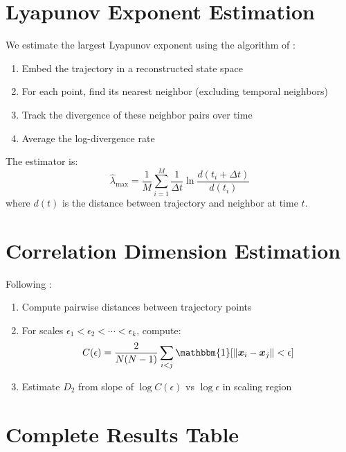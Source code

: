 \documentclass[10pt]{article} %
\theoremstyle{plain}
\theoremstyle{definition}
\theoremstyle{remark}
\newcommand{\norm}[1]{\left\lVert#1\right\rVert}
\newcommand{\vect}[1]{\bm{#1}}
\begin{document}
\section{Lyapunov Exponent Estimation}

We estimate the largest Lyapunov exponent using the algorithm of \citet{wolf1985}:

\begin{enumerate}
    \item Embed the trajectory in a reconstructed state space
    \item For each point, find its nearest neighbor (excluding temporal neighbors)
    \item Track the divergence of these neighbor pairs over time
    \item Average the log-divergence rate
\end{enumerate}

The estimator is:
\begin{equation}
    \hat{\lambda}_{\max} = \frac{1}{M} \sum_{i=1}^{M} \frac{1}{\Delta t} \ln \frac{d(t_i + \Delta t)}{d(t_i)}
\end{equation}
where $d(t)$ is the distance between trajectory and neighbor at time $t$.

\section{Correlation Dimension Estimation}

Following \citet{grassberger1983}:

\begin{enumerate}
    \item Compute pairwise distances between trajectory points
    \item For scales $\epsilon_1 < \epsilon_2 < \cdots < \epsilon_k$, compute:
    \begin{equation}
        C(\epsilon) = \frac{2}{N(N-1)} \sum_{i<j} \mathbbm{1}[\norm{\vect{x}_i - \vect{x}_j} < \epsilon]
    \end{equation}
    \item Estimate $D_2$ from slope of $\log C(\epsilon)$ vs $\log \epsilon$ in scaling region
\end{enumerate}

\clearpage
\section{Complete Results Table}
\end{document}
